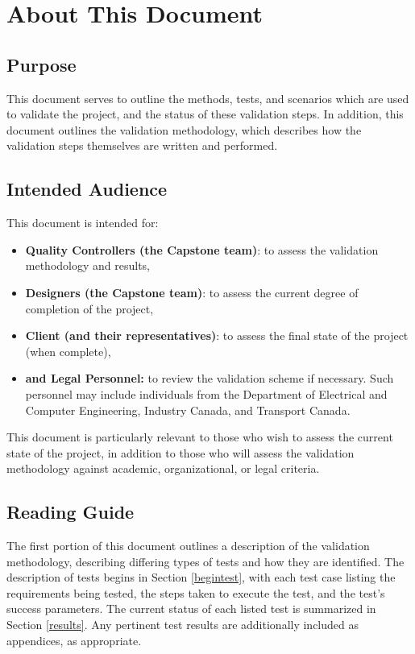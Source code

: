 \documentclass[10pt,letterpaper]{article}
\begin{document}




\section{About This Document}

\subsection{Purpose}
This document serves to outline the methods, tests, and scenarios which are used to validate the project, and the status of these validation steps. In addition, this document outlines the validation methodology, which describes how the validation steps themselves are written and performed.

\subsection{Intended Audience}
This document is intended for:
\begin{itemize}
\item \textbf{Quality Controllers (the Capstone team)}: to assess the validation methodology and results,
\item \textbf{Designers (the Capstone team)}: to assess the current degree of completion of the project,
\item \textbf{Client (and their representatives)}: to assess the final state of the project (when complete),
\item \textbf{and Legal Personnel:} to review the validation scheme if necessary. Such personnel may include individuals from the Department of Electrical and Computer Engineering, Industry Canada, and Transport Canada.
\end{itemize}

This document is particularly relevant to those who wish to assess the current state of the project, in addition to those who will assess the validation methodology against academic, organizational, or legal criteria.

\subsection{Reading Guide}
The first portion of this document outlines a description of the validation methodology, describing differing types of tests and how they are identified. The description of tests begins in Section \ref{begintest}, with each test case listing the requirements being tested, the steps taken to execute the test, and the test's success parameters. The current status of each listed test is summarized in Section \ref{results}. Any pertinent test results are additionally included as appendices, as appropriate.
\end{document}
